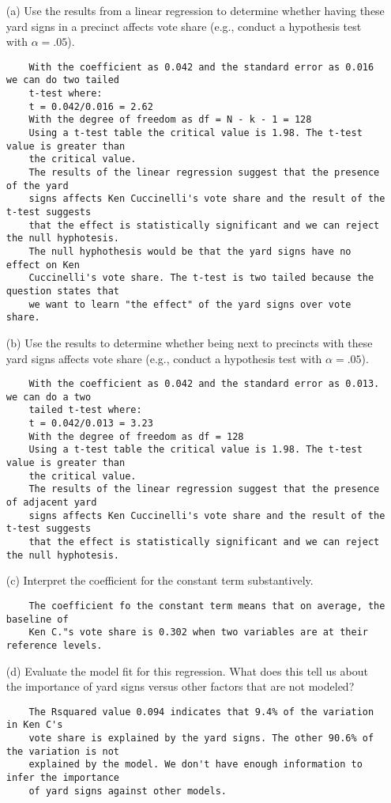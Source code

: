 \documentclass[12pt,letterpaper]{article}
\begin{document}
\vspace{.5cm}
\begin{enumerate}
	\item [(a)] Use the results from a linear regression to determine whether having these yard signs in a precinct affects vote share (e.g., conduct a hypothesis test with $\alpha = .05$).
\begin{verbatim}
	With the coefficient as 0.042 and the standard error as 0.016 we can do two tailed
	t-test where:
	t = 0.042/0.016 = 2.62
	With the degree of freedom as df = N - k - 1 = 128
	Using a t-test table the critical value is 1.98. The t-test value is greater than
	the critical value. 
	The results of the linear regression suggest that the presence of the yard 
	signs affects Ken Cuccinelli's vote share and the result of the t-test suggests 
	that the effect is statistically significant and we can reject the null hyphotesis.
	The null hyphothesis would be that the yard signs have no effect on Ken
	Cuccinelli's vote share. The t-test is two tailed because the question states that
	we want to learn "the effect" of the yard signs over vote share.
\end{verbatim}
	\newpage		
	\item [(b)]  Use the results to determine whether being
	next to precincts with these yard signs affects vote
	share (e.g., conduct a hypothesis test with $\alpha = .05$).
\begin{verbatim}
	With the coefficient as 0.042 and the standard error as 0.013. we can do a two
	tailed t-test where:
	t = 0.042/0.013 = 3.23
	With the degree of freedom as df = 128
	Using a t-test table the critical value is 1.98. The t-test value is greater than
	the critical value. 
	The results of the linear regression suggest that the presence of adjacent yard 
	signs affects Ken Cuccinelli's vote share and the result of the t-test suggests 
	that the effect is statistically significant and we can reject the null hyphotesis.
\end{verbatim}
	\item [(c)] Interpret the coefficient for the constant term substantively.
\begin{verbatim}
	The coefficient fo the constant term means that on average, the baseline of
	Ken C."s vote share is 0.302 when two variables are at their reference levels.
\end{verbatim}	
	
	\item [(d)] Evaluate the model fit for this regression.  What does this	tell us about the importance of yard signs versus other factors that are not modeled?
\begin{verbatim}
	The Rsquared value 0.094 indicates that 9.4% of the variation in Ken C's 
	vote share is explained by the yard signs. The other 90.6% of the variation is not
	explained by the model. We don't have enough information to infer the importance
	of yard signs against other models. 
\end{verbatim}
	
\end{enumerate}  
\end{document}
